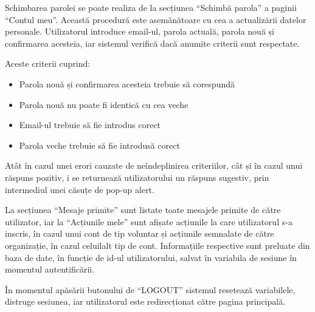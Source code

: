 \documentclass[12pt,a4paper]{report}
\begin{document}
\newpage
\par
Schimbarea parolei se poate realiza de la secțiunea  “Schimbă parola” a paginii  “Contul meu”. Această procedură este asemănătoare cu cea a actualizării datelor personale. Utilizatorul introduce email-ul, parola actuală, parola nouă și confirmarea acesteia, iar sistemul verifică dacă anumite criterii sunt respectate.
\\
\par
Aceste criterii cuprind:
\begin{itemize}
  \item Parola nouă și confirmarea acesteia trebuie să corespundă
  \item Parola nouă nu poate fi identică cu cea veche
  \item Email-ul trebuie să fie introdus corect
  \item Parola veche trebuie să fie introdusă corect
\end{itemize}

\par
Atât în cazul unei erori cauzate de neîndeplinirea criteriilor, cât și în cazul unui răspuns pozitiv, i se returnează utilizatorului un răspuns sugestiv, prin intermediul unei căsuțe de pop-up alert.
\\
\par
La secțiunea  “Mesaje primite” sunt listate toate mesajele primite de către utilizator, iar la  “Acțiunile mele” sunt afișate acțiunile la care utilizatorul s-a inscris, în cazul unui cont de tip voluntar și acțiunile semnalate de către organizație, în cazul celuilalt tip de cont. Informațiile respective sunt preluate din baza de date, în funcție de id-ul utilizatorului, salvat în variabila de sesiune în momentul autentificării.
\\
\par
În momentul apăsării butonului de  “LOGOUT”  sistemul resetează variabilele, distruge sesiunea, iar utilizatorul este redirecționat către pagina principală.
\end{document}
